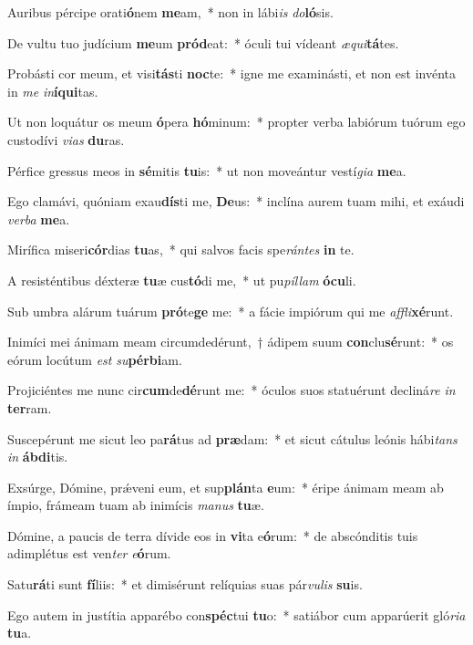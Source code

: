 \item Auribus pércipe orati\textbf{ó}nem \textbf{me}am,~* non in lábi\textit{is} \textit{do}\textbf{ló}sis.
\item De vultu tuo judícium \textbf{me}um \textbf{pród}eat:~* óculi tui vídeant \textit{æ}\textit{qui}\textbf{tá}tes.
\item Probásti cor meum, et visi\textbf{tás}ti \textbf{noc}te:~* igne me examinásti, et non est invénta in \textit{me} \textit{in}\textbf{í}\textbf{qui}tas.
\item Ut non loquátur os meum \textbf{ó}pera \textbf{hó}minum:~* propter verba labiórum tuórum ego custodívi \textit{vi}\textit{as} \textbf{du}ras.
\item Pérfice gressus meos in \textbf{sé}mitis \textbf{tu}is:~* ut non moveántur vestí\textit{gi}\textit{a} \textbf{me}a.
\item Ego clamávi, quóniam exau\textbf{dís}ti me, \textbf{De}us:~* inclína aurem tuam mihi, et exáudi \textit{ver}\textit{ba} \textbf{me}a.
\item Mirífica miseri\textbf{cór}dias \textbf{tu}as,~* qui salvos facis spe\textit{rán}\textit{tes} \textbf{in} te.
\item A resisténtibus déxteræ \textbf{tu}æ cus\textbf{tó}di me,~* ut pu\textit{píl}\textit{lam} \textbf{ó}\textbf{cu}li.
\item Sub umbra alárum tuárum \textbf{pró}te\textbf{ge} me:~* a fácie impiórum qui me \textit{af}\textit{fli}\textbf{xé}runt.
\item Inimíci mei ánimam meam circumdedérunt,~† ádipem suum \textbf{con}clu\textbf{sé}runt:~* os eórum locútum \textit{est} \textit{su}\textbf{pér}\textbf{bi}am.
\item Projiciéntes me nunc cir\textbf{cum}de\textbf{dé}runt me:~* óculos suos statuérunt decliná\textit{re} \textit{in} \textbf{ter}ram.
\item Suscepérunt me sicut leo pa\textbf{rá}tus ad \textbf{præ}dam:~* et sicut cátulus leónis hábi\textit{tans} \textit{in} \textbf{áb}\textbf{di}tis.
\item Exsúrge, Dómine, prǽveni eum, et sup\textbf{plán}ta \textbf{e}um:~* éripe ánimam meam ab ímpio, frámeam tuam ab inimícis \textit{ma}\textit{nus} \textbf{tu}æ.
\item Dómine, a paucis de terra dívide eos in \textbf{vi}ta e\textbf{ó}rum:~* de abscónditis tuis adimplétus est ven\textit{ter} \textit{e}\textbf{ó}rum.
\item Satu\textbf{rá}ti sunt \textbf{fí}liis:~* et dimisérunt relíquias suas pár\textit{vu}\textit{lis} \textbf{su}is.
\item Ego autem in justítia apparébo con\textbf{spéc}tui \textbf{tu}o:~* satiábor cum apparúerit gló\textit{ri}\textit{a} \textbf{tu}a.
